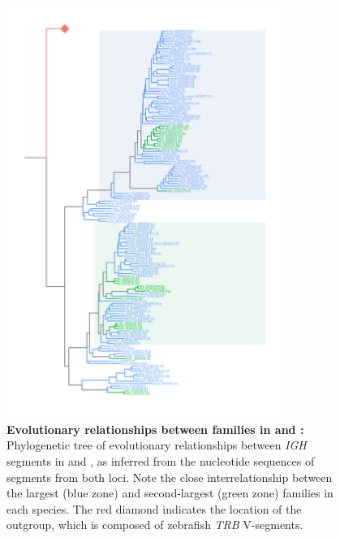 	\begin{figure}
	\centering
	\includegraphics[width=0.8\textwidth]{_Figures/png/nfu-xma-vh-tree-nt.png}
	\caption[Evolutionary relationships between \vh families in \Xma and \Nfu]{\textbf{Evolutionary relationships between \vh families in \Xma and \Nfu:} Phylogenetic tree of evolutionary relationships between \textit{IGH} \vh segments in \Nfu and \Xma, as inferred from the nucleotide sequences of \vh segments from both loci. Note the close interrelationship between the largest (blue zone) and second-largest (green zone) families in each species. The red diamond indicates the location of the outgroup, which is composed of zebrafish \textit{TRB} V-segments.}
	\label{fig:nfu-xma-vh-tree-nt}
	\end{figure}
	
